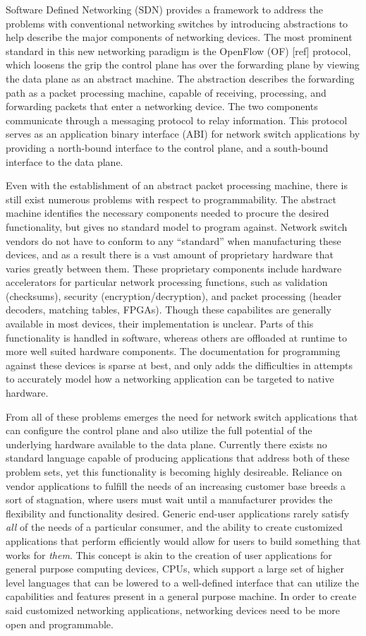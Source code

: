 Software Defined Networking (SDN) provides a framework to address the
problems with conventional networking switches by introducing abstractions
to help describe the major components of networking devices. The most prominent
standard in this new networking paradigm is the OpenFlow (OF) [ref] protocol,
which loosens the grip the control plane has over the forwarding plane by
viewing the data plane as an abstract machine. The abstraction describes the
forwarding path as a packet processing machine, capable of receiving,
processing, and forwarding packets that enter a networking device. The two
components communicate through a messaging protocol to relay information. This
protocol serves as an application binary interface (ABI) for network switch
applications by providing a north-bound interface to the control plane, and a
south-bound interface to the data plane.

Even with the establishment of an abstract packet processing machine, there
is still exist numerous problems with respect to programmability. The abstract
machine identifies the necessary components needed to procure the desired
functionality, but gives no standard model to program against. Network switch
vendors do not have to conform to any ``standard'' when manufacturing these
devices, and as a result there is a vast amount of proprietary hardware that
varies greatly between them. These proprietary components include hardware
accelerators for particular network processing functions, such as validation
(checksums), security (encryption/decryption), and packet processing (header
decoders, matching tables, FPGAs). Though these capabilites are generally
available in most devices, their implementation is unclear. Parts of this
functionality is handled in software, whereas others are offloaded at runtime
to more well suited hardware components. The documentation for programming
against these devices is sparse at best, and only adds the difficulties in
attempts to accurately model how a networking application can be targeted to
native hardware.

From all of these problems emerges the need for network switch applications
that can configure the control plane and also utilize the full potential of
the underlying hardware available to the data plane. Currently there exists
no standard language capable of producing applications that address both of
these problem sets, yet this functionality is becoming highly desireable.
Reliance on vendor applications to fulfill the needs of an increasing customer
base breeds a sort of stagnation, where users must wait until a manufacturer
provides the flexibility and functionality desired. Generic end-user
applications rarely satisfy \emph{all} of the needs of a particular consumer,
and the ability to create customized applications that perform efficiently
would allow for users to build something that works for \emph{them}. This
concept is akin to the creation of user applications for general purpose
computing devices, CPUs, which support a large set of higher level languages
that can be lowered to a well-defined interface that can utilize the
capabilities and features present in a general purpose machine. In order to
create said customized networking applications, networking devices need to be
more open and programmable.

